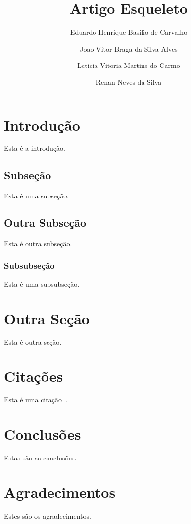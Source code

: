\documentclass[conference,harvard,brazil,english]{sbatex}
\begin{document}
\title{Artigo Esqueleto}

\author{Eduardo Henrique Basilio de Carvalho}
\author{Joao Vitor Braga da Silva Alves}
\author{Leticia Vitoria Martins do Carmo}
\author{Renan Neves da Silva}

\maketitle


\section{Introdução}

	Esta é a introdução.

\subsection{Subseção}

	Esta é uma subseção.

\subsection{Outra Subseção}

	Esta é outra subseção.

\subsubsection{Subsubseção}

	Esta é uma subsubseção.

\section{Outra Seção}

	Esta é outra seção.

\section{Citações}

    Esta é uma citação~\cite{sbatex}.

\section{Conclusões}

	Estas são as conclusões.

\section*{Agradecimentos}

	Estes são os agradecimentos.


\end{document}
